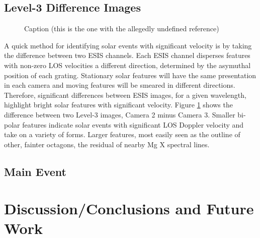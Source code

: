     \subsection{Level-3 Difference Images}

	\begin{figure}[htb!]
	    \centering
		\caption{Caption (this is the one with the allegedly undefined reference)}
		\label{fig:l3_dif}
	\end{figure}

        
        A quick method for identifying solar events with significant velocity is by taking the difference between two ESIS channels.
    	Each ESIS channel disperses features with non-zero LOS velocities a different direction, determined by the asymuthal position of each grating. 
    	Stationary solar features will have the same presentation in each camera and moving features will be smeared in different directions.
    	Therefore, significant differences between ESIS images, for a given wavelength, highlight bright solar features with significant velocity.
    	Figure \ref{fig:l3_dif} shows the difference between two Level-3 images, Camera 2 minus Camera 3. 
    	Smaller bi-polar features indicate solar events with significant LOS Doppler velocity and take on a variety of forms.
    	Larger features, most easily seen as the outline of other, fainter octagons, the residual of nearby Mg X spectral lines.
    
    \subsection{Main Event}

\section{Discussion/Conclusions and Future Work}

